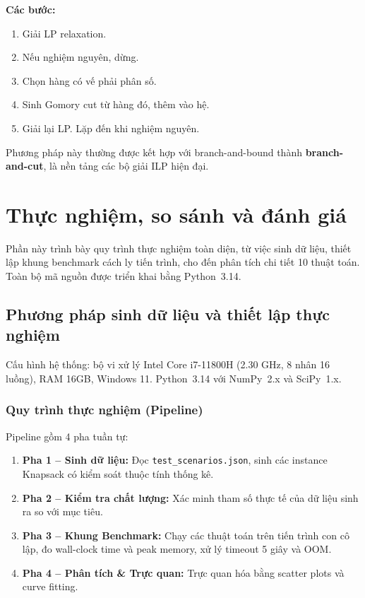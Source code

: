 \textbf{Các bước:}
\begin{enumerate}
    \item Giải LP relaxation.
    \item Nếu nghiệm nguyên, dừng.
    \item Chọn hàng có vế phải phân số.
    \item Sinh Gomory cut từ hàng đó, thêm vào hệ.
    \item Giải lại LP. Lặp đến khi nghiệm nguyên.
\end{enumerate}

Phương pháp này thường được kết hợp với branch-and-bound thành \textbf{branch-and-cut}, là nền tảng các bộ giải ILP hiện đại.


\section{Thực nghiệm, so sánh và đánh giá}
\label{sec:result}

Phần này trình bày quy trình thực nghiệm toàn diện, từ việc sinh dữ liệu, thiết lập khung benchmark cách ly tiến trình, cho đến phân tích chi tiết 10 thuật toán. Toàn bộ mã nguồn được triển khai bằng Python~3.14.

\subsection{Phương pháp sinh dữ liệu và thiết lập thực nghiệm}
\label{subsec:setup}

Cấu hình hệ thống: bộ vi xử lý Intel Core i7-11800H (2.30 GHz, 8 nhân 16 luồng), RAM 16GB, Windows 11. Python~3.14 với NumPy~2.x và SciPy~1.x.

\subsubsection{Quy trình thực nghiệm (Pipeline)}

Pipeline gồm 4 pha tuần tự:
\begin{enumerate}[leftmargin=*]
    \item \textbf{Pha 1 -- Sinh dữ liệu:} Đọc \texttt{test\_scenarios.json}, sinh các instance Knapsack có kiểm soát thuộc tính thống kê.
    \item \textbf{Pha 2 -- Kiểm tra chất lượng:} Xác minh tham số thực tế của dữ liệu sinh ra so với mục tiêu.
    \item \textbf{Pha 3 -- Khung Benchmark:} Chạy các thuật toán trên tiến trình con cô lập, đo wall-clock time và peak memory, xử lý timeout 5 giây và OOM.
    \item \textbf{Pha 4 -- Phân tích \& Trực quan:} Trực quan hóa bằng scatter plots và curve fitting.
\end{enumerate}

